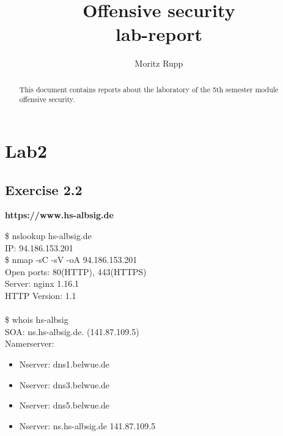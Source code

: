 \documentclass[a4paper,10pt]{article}
\title{Offensive security\\lab-report}
\author{Moritz Rupp}
\begin{document}
\maketitle

\begin{abstract}
\noindent This document contains reports about the laboratory of the 5th semester module offensive security. 
\end{abstract}
\tableofcontents

\newpage
\section{Lab2}
\subsection{Exercise 2.2}
\begin{center}
\textbf{https://www.hs-albsig.de} 
\end{center}
\$\raisebox{-0.9ex}{\~{}} nslookup hs-albsig.de \\
IP: 94.186.153.201\\ 


\noindent\$\raisebox{-0.9ex}{\~{}} nmap -sC -sV -oA 94.186.153.201\\
Open ports: 80(HTTP), 443(HTTPS)\\
Server: nginx 1.16.1\\
HTTP Version: 1.1 
\\
\\
\$\raisebox{-0.9ex}{\~{}} whois hs-albsig\\
SOA: ns.hs-albsig.de. (141.87.109.5)\\  
Namerserver:
\begin{itemize}
\item Nserver: dns1.belwue.de
\item Nserver: dns3.belwue.de
\item Nserver: dns5.belwue.de
\item Nserver: ns.hs-albsig.de 141.87.109.5
\end{itemize}
 
\end{document}
